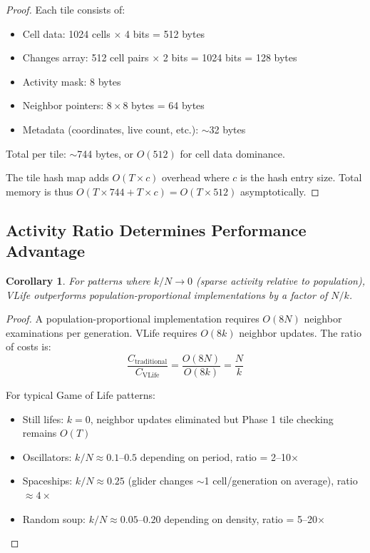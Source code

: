 \documentclass[11pt]{article}
\newtheorem{corollary}{Corollary}[theorem]
\theoremstyle{definition}
\begin{document}
    \begin{proof}
        Each tile consists of:
        \begin{itemize}
            \item Cell data: 1024 cells $\times$ 4 bits = 512 bytes
            \item Changes array: 512 cell pairs $\times$ 2 bits = 1024 bits = 128 bytes
            \item Activity mask: 8 bytes
            \item Neighbor pointers: $8 \times 8$ bytes = 64 bytes
            \item Metadata (coordinates, live count, etc.): $\sim$32 bytes
        \end{itemize}

        Total per tile: $\sim$744 bytes, or $O(512)$ for cell data dominance.

        The tile hash map adds $O(T \times c)$ overhead where $c$ is the hash entry size. Total memory is thus $O(T \times 744 + T \times c) = O(T \times 512)$ asymptotically.
    \end{proof}

    \subsection{Activity Ratio Determines Performance Advantage}

    \begin{corollary}
        For patterns where $k/N \to 0$ (sparse activity relative to population), VLife outperforms population-proportional implementations by a factor of $N/k$.
    \end{corollary}

    \begin{proof}
        A population-proportional implementation requires $O(8N)$ neighbor examinations per generation. VLife requires $O(8k)$ neighbor updates. The ratio of costs is:
        \[\frac{C_{\text{traditional}}}{C_{\text{VLife}}} = \frac{O(8N)}{O(8k)} = \frac{N}{k}\]

        For typical Game of Life patterns:
        \begin{itemize}
            \item Still lifes: $k = 0$, neighbor updates eliminated but Phase 1 tile checking remains $O(T)$
            \item Oscillators: $k/N \approx 0.1$--$0.5$ depending on period, ratio = 2--10$\times$
            \item Spaceships: $k/N \approx 0.25$ (glider changes $\sim$1 cell/generation on average), ratio $\approx 4\times$
            \item Random soup: $k/N \approx 0.05$--$0.20$ depending on density, ratio = 5--20$\times$
        \end{itemize}
    \end{proof}
\end{document}

